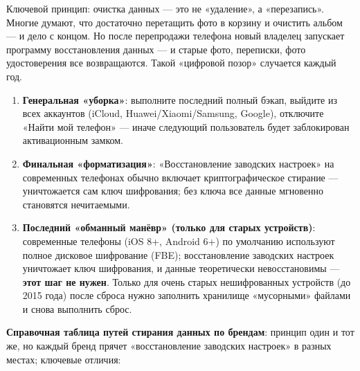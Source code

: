 


Ключевой принцип: очистка данных — это не «удаление», а «перезапись». Многие думают, что достаточно перетащить фото в корзину и очистить альбом — и дело с концом. Но после перепродажи телефона новый владелец запускает программу восстановления данных — и старые фото, переписки, фото удостоверения все возвращаются. Такой «цифровой позор» случается каждый год.

\begin{enumerate}
  \item \textbf{Генеральная «уборка»}: выполните последний полный бэкап, выйдите из всех аккаунтов (iCloud, Huawei/Xiaomi/Samsung, Google), отключите «Найти мой телефон» — иначе следующий пользователь будет заблокирован активационным замком.
  \item \textbf{Финальная «форматизация»}: «Восстановление заводских настроек» на современных телефонах обычно включает криптографическое стирание — уничтожается сам ключ шифрования; без ключа все данные мгновенно становятся нечитаемыми.
  \item \textbf{Последний «обманный манёвр» (только для старых устройств)}: современные телефоны (iOS 8+, Android 6+) по умолчанию используют полное дисковое шифрование (FBE); восстановление заводских настроек уничтожает ключ шифрования, и данные теоретически невосстановимы —\textbf{этот шаг не нужен}. Только для очень старых нешифрованных устройств (до 2015 года) после сброса нужно заполнить хранилище «мусорными» файлами и снова выполнить сброс.
\end{enumerate}

\textbf{Справочная таблица путей стирания данных по брендам}: принцип один и тот же, но каждый бренд прячет «восстановление заводских настроек» в разных местах; ключевые отличия:

